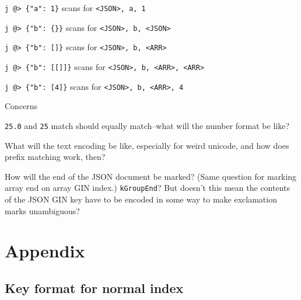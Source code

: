 \documentclass[11pt]{article}
\begin{document}
\begin{oparts}
\item
  \texttt{j\ @\textgreater{}\ \textquotesingle{}\{"a":\ 1\}\textquotesingle{}}
  scans for \texttt{\textless{}JSON\textgreater{},\ a,\ 1}
\item
  \texttt{j\ @\textgreater{}\ \textquotesingle{}\{"b":\ \{\}\}\textquotesingle{}}
  scans for
  \texttt{\textless{}JSON\textgreater{},\ b,\ \textless{}JSON\textgreater{}}
\item
  \texttt{j\ @\textgreater{}\ \textquotesingle{}\{"b":\ {[}{]}\}\textquotesingle{}}
  scans for
  \texttt{\textless{}JSON\textgreater{},\ b,\ \textless{}ARR\textgreater{}}
\item
  \texttt{j\ @\textgreater{}\ \textquotesingle{}\{"b":\ {[}{[}{]}{]}\}\textquotesingle{}}
  scans for
  \texttt{\textless{}JSON\textgreater{},\ b,\ \textless{}ARR\textgreater{},\ \textless{}ARR\textgreater{}}
\item
  \texttt{j\ @\textgreater{}\ \textquotesingle{}\{"b":\ {[}4{]}\}\textquotesingle{}}
  scans for
  \texttt{\textless{}JSON\textgreater{},\ b,\ \textless{}ARR\textgreater{},\ 4}
\end{oparts}

Concerns

\begin{oparts}
\item
  \texttt{25.0} and \texttt{25} match should equally match--what will
  the number format be like?
\item
  What will the text encoding be like, especially for weird unicode, and
  how does prefix matching work, then?
\item
  How will the end of the JSON document be marked? (Same question for
  marking array end on array GIN index.) \texttt{kGroupEnd}? But doesn't
  this mean the contents of the JSON GIN key have to be encoded in some
  way to make exclamation marks unambiguous?
\end{oparts}

\hypertarget{appendix}{%
\section{Appendix}\label{appendix}}

\hypertarget{key-format-for-normal-index}{%
\subsection{Key format for normal
index}\label{key-format-for-normal-index}}
\end{document}
